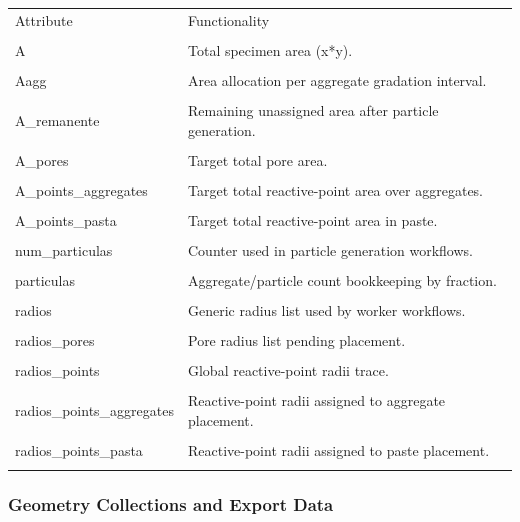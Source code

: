 ﻿\documentclass[11pt,a4paper]{article}
\begin{document}
\begin{longtable}{|p{}|p{}|}
\hline
Attribute & Functionality \\\\
\hline
A & Total specimen area (x*y). \\\\
\hline
Aagg & Area allocation per aggregate gradation interval. \\\\
\hline
A\_remanente & Remaining unassigned area after particle generation. \\\\
\hline
A\_pores & Target total pore area. \\\\
\hline
A\_points\_aggregates & Target total reactive-point area over aggregates. \\\\
\hline
A\_points\_pasta & Target total reactive-point area in paste. \\\\
\hline
num\_particulas & Counter used in particle generation workflows. \\\\
\hline
particulas & Aggregate/particle count bookkeeping by fraction. \\\\
\hline
radios & Generic radius list used by worker workflows. \\\\
\hline
radios\_pores & Pore radius list pending placement. \\\\
\hline
radios\_points & Global reactive-point radii trace. \\\\
\hline
radios\_points\_aggregates & Reactive-point radii assigned to aggregate placement. \\\\
\hline
radios\_points\_pasta & Reactive-point radii assigned to paste placement. \\\\
\hline
\end{longtable}


\subsubsection*{Geometry Collections and Export Data}
\end{document}
